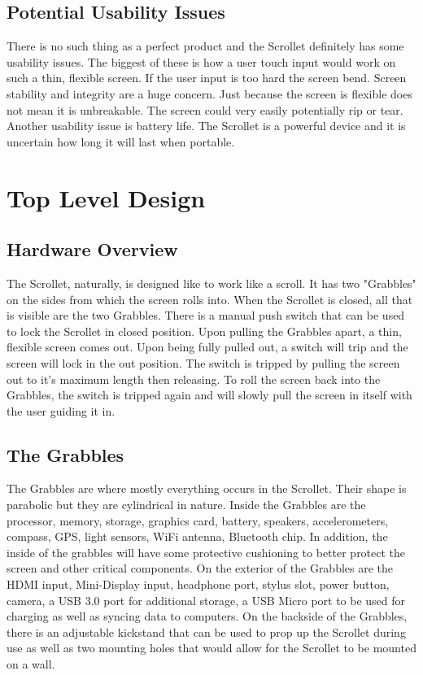 \documentclass[a4paper]{article}
\begin{document}
\subsection{Potential Usability Issues}
There is no such thing as a perfect product and the Scrollet definitely has some usability issues. The biggest of these is how a user touch input would work on such a thin, flexible screen. If the user input is too hard the screen bend. Screen stability and integrity are a huge concern. Just because the screen is flexible does not mean it is unbreakable. The screen could very easily potentially rip or tear. Another usability issue is battery life. The Scrollet is a powerful device and it is uncertain how long it will last when portable. 

\section{Top Level Design}
\subsection{Hardware Overview}
The Scrollet, naturally, is designed like to work like a scroll. It has two "Grabbles" on the sides from which the screen rolls into. When the Scrollet is closed, all that is visible are the two Grabbles. There is a manual push switch that can be used to lock the Scrollet in closed position. Upon pulling the Grabbles apart, a thin, flexible screen comes out. Upon being fully pulled out, a switch will trip and the screen will lock in the out position. The switch is tripped by pulling the screen out to it's maximum length then releasing. To roll the screen back into the Grabbles, the switch is tripped again and will slowly pull the screen in itself with the user guiding it in.

\subsection{The Grabbles}
The Grabbles are where mostly everything occurs in the Scrollet. Their shape is parabolic but they are cylindrical in nature. Inside the Grabbles are the processor, memory, storage, graphics card, battery, speakers, accelerometers, compass, GPS, light sensors, WiFi antenna, Bluetooth chip. In addition, the inside of the grabbles will have some protective cushioning to better protect the screen and other critical components. On the exterior of the Grabbles are the HDMI input, Mini-Display input, headphone port, stylus slot, power button, camera, a USB 3.0 port for additional storage, a USB Micro port to be used for charging as well as syncing data to computers. On the backside of the Grabbles, there is an adjustable kickstand that can be used to prop up the Scrollet during use as well as two mounting holes that would allow for the Scrollet to be mounted on a wall.
\end{document}
